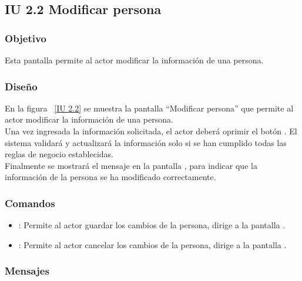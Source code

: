 \newpage 
\subsection{IU 2.2 Modificar persona}

\subsubsection{Objetivo}
	
    Esta pantalla permite al actor modificar la información de una persona.

\subsubsection{Diseño}

    En la figura ~\ref{IU 2.2} se muestra la pantalla ``Modificar persona'' que permite al actor modificar la información de una persona. \\
    
    Una vez ingresada la información solicitada, el actor deberá oprimir el botón . El sistema validará y actualizará la 
    información solo si se han cumplido todas las reglas de negocio establecidas.  \\
    
    Finalmente se mostrará el mensaje  en la pantalla , 
    para indicar que la información de la persona
    se ha modificado correctamente.        



\subsubsection{Comandos}
\begin{itemize}
	\item {}: Permite al actor guardar los cambios de la persona, dirige a la pantalla .
	\item {}: Permite al actor cancelar los cambios de la persona, dirige a la pantalla .
\end{itemize}

\subsubsection{Mensajes}
	
